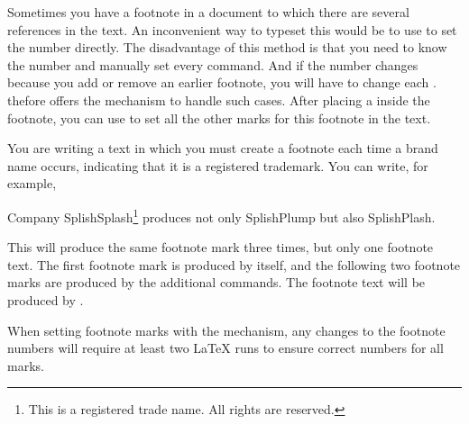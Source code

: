 \begin{Declaration}
\end{Declaration}
Sometimes you have a footnote in a document to which there are several references
in the text. An inconvenient way to typeset this would be to use
 to set the number directly.
The disadvantage of this method is that you need to know the number and
manually set every  command.
And if the number changes because you add or remove an earlier footnote, you
will have to change each .
\KOMAScript{} thefore offers the %
 mechanism to handle such cases. After placing a
 inside the footnote, you can use  to set all the
other marks for this footnote in the text.
\IfThisCommonFirstRun{\iftrue}{\csname iffalse\endcsname}%
  \begin{Example}
    You are writing a text in which you must create a footnote each time a
    brand name occurs, indicating that it is a registered trademark. You can
    write, for example,
\begin{lstcode}
  Company SplishSplash\footnote{This is a registered trade name.
    All rights are reserved.\label{refnote}}
  produces not only SplishPlump
  but also SplishPlash.
\end{lstcode}
    This will produce the same footnote mark three times, but only one
    footnote text. The first footnote mark is produced by
     itself, and the following two
    footnote marks are produced by the additional 
    commands. The footnote text will be produced by
    . 
  \end{Example}
\fi%
When setting footnote marks with the  mechanism, any
changes to the footnote numbers will require at least two \LaTeX{} runs to
ensure correct numbers for all  marks.%
%
